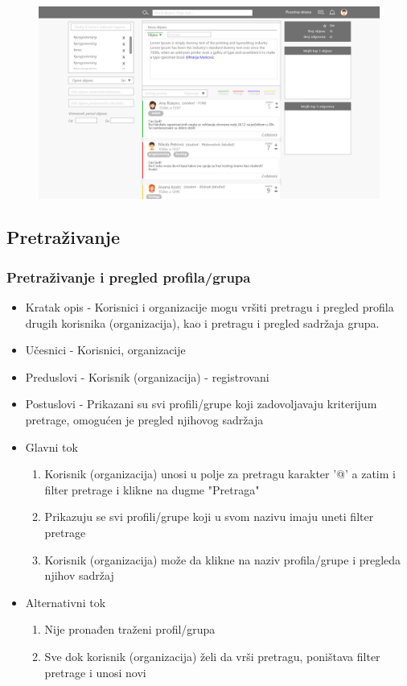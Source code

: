 \begin{figure}[h!]
		\centerline{\includegraphics[scale=0.3]{slike/deljenje_sadrzaja.png}}
\end{figure}

\clearpage

\subsection{Pretraživanje}
\subsubsection{Pretraživanje i pregled profila/grupa}
\begin{itemize}
	\item Kratak opis - Korisnici i organizacije mogu vršiti pretragu i pregled profila drugih korisnika (organizacija), kao i pretragu i pregled sadržaja grupa.
	\item Učesnici - Korisnici, organizacije
	\item Preduslovi - Korisnik (organizacija) - registrovani
	\item Postuslovi - Prikazani su svi profili/grupe koji zadovoljavaju kriterijum pretrage, omogućen je pregled njihovog sadržaja
	\item Glavni tok
	\begin{enumerate}
		\item Korisnik (organizacija) unosi u polje za pretragu karakter '@' a zatim i filter pretrage i klikne na dugme "Pretraga"
		\item Prikazuju se svi profili/grupe koji u svom nazivu imaju uneti filter pretrage
		\item Korisnik (organizacija) može da klikne na naziv profila/grupe i pregleda njihov sadržaj
	\end{enumerate}
	\item Alternativni tok
	\begin{enumerate}
		\item Nije pronađen traženi profil/grupa
		\item Sve dok korisnik (organizacija) želi da vrši pretragu, poništava filter pretrage i unosi novi
	\end{enumerate}
\end{itemize}

